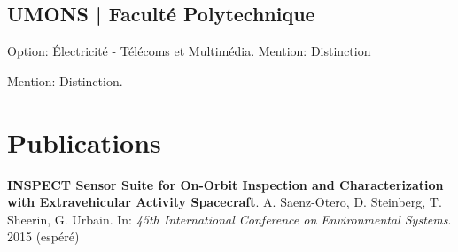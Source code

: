 \documentclass[a4paper]{deedy-resume} %
\begin{document}
\begin{minipage}[t]{0.74\textwidth}
\subsection{UMONS | Faculté Polytechnique}
\vspace{2pt}
Option: Électricité - Télécoms et Multimédia. Mention: Distinction

\vspace{3pt}
Mention: Distinction.




\section{Publications}
\textbf{INSPECT Sensor Suite for On-Orbit Inspection and Characterization with Extravehicular Activity Spacecraft}. 
A. Saenz-Otero, D. Steinberg, T. Sheerin, G. Urbain. In: \textit{45th International Conference on Environmental Systems}. 2015 (espéré)


\end{minipage} %








\end{document}
